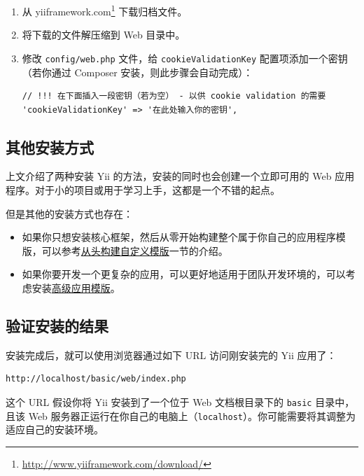 \begin{enumerate}
\item 从 yiiframework.com\footnote{\url{http://www.yiiframework.com/download/}} 下载归档文件。
\item 将下载的文件解压缩到 Web 目录中。
\item 修改 \lstinline|config/web.php| 文件，给 \lstinline|cookieValidationKey| 配置项添加一个密钥（若你通过 Composer 安装，则此步骤会自动完成）：

\lstset{language=php}\begin{lstlisting}
// !!! 在下面插入一段密钥（若为空） - 以供 cookie validation 的需要
'cookieValidationKey' => '在此处输入你的密钥',
\end{lstlisting}

\end{enumerate}
\subsection{其他安装方式 \label{start-installation.md::other-installation-options}}
上文介绍了两种安装 Yii 的方法，安装的同时也会创建一个立即可用的 Web 应用程序。对于小的项目或用于学习上手，这都是一个不错的起点。

但是其他的安装方式也存在：

\begin{itemize}
\item 如果你只想安装核心框架，然后从零开始构建整个属于你自己的应用程序模版，可以参考\hyperref[tutorial-start-from-scratch.md]{从头构建自定义模版}一节的介绍。
\item 如果你要开发一个更复杂的应用，可以更好地适用于团队开发环境的，可以考虑安装\hyperref[tutorial-advanced-app.md]{高级应用模版}。
\end{itemize}
\subsection{验证安装的结果 \label{start-installation.md::verifying-installation}}
安装完成后，就可以使用浏览器通过如下 URL 访问刚安装完的 Yii 应用了：

\begin{lstlisting}
http://localhost/basic/web/index.php
\end{lstlisting}
这个 URL 假设你将 Yii 安装到了一个位于 Web 文档根目录下的 \lstinline|basic| 目录中，且该 Web 服务器正运行在你自己的电脑上（\lstinline|localhost|）。你可能需要将其调整为适应自己的安装环境。

